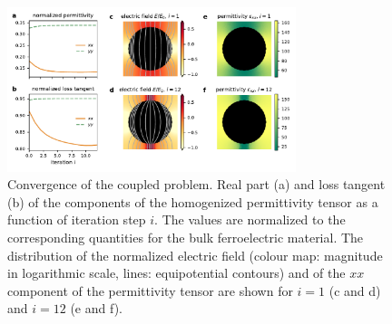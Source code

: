\documentclass[%
 aip,
 amsmath,amssymb,
 reprint,%
linenumbers
]{revtex4-1}
\newcommand{\co}[1]{\textcolor{correction}{#1}}
\begin{document}
\begin{figure}[!t]
 \centering
 \includegraphics[width=0.75\textwidth]{convergence_per}
 \caption{Convergence of the coupled problem.
  Real part (a) and loss tangent (b) of the components of the homogenized
  permittivity tensor as a function of iteration step $i$. \co{The values are normalized to the corresponding quantities for the bulk ferroelectric material.} The distribution of
  the normalized electric field (colour map: magnitude in logarithmic scale,
  lines: equipotential contours) and of the
  $xx$ component of the permittivity tensor are shown for $i=1$
  (c and d) and $i=12$ (e and f).
 }
 \label{conv2D}
\end{figure}

\end{document}
